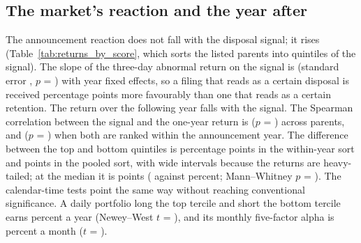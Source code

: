 \begin{table}
\centering
\caption{Disposal prediction from the filing text: identified and anonymized conditions}\label{tab:gate1}
{\footnotesize\setlength{\tabcolsep}{3pt}}
\end{table}

\subsection{The market's reaction and the year after}\label{sec:market}

The announcement reaction does not fall with the disposal signal; it rises (Table~\ref{tab:returns_by_score}, which sorts the listed parents into quintiles of the signal). The slope of the three-day abnormal return on the signal is \AnnCarSlope{} (standard error \AnnCarSlopeSE{}, $p$ = \AnnCarSlopeP{}) with year fixed effects, so a filing that reads as a certain disposal is received \AnnCarSlopePP{} percentage points more favourably than one that reads as a certain retention. The return over the following year falls with the signal. The Spearman correlation between the signal and the one-year return is \SpearmanScoreBhar{} ($p$ = \SpearmanScoreBharP) across \NScoreOneY{} parents, and \SpearmanWithinYear{} ($p$ = \SpearmanWithinYearP) when both are ranked within the announcement year. The difference between the top and bottom quintiles is \QQWithinYear{} percentage points in the within-year sort and \QQDiff{} points in the pooled sort, with wide intervals because the returns are heavy-tailed; at the median it is \QQMedianDiff{} points (\QFiveMedian{} against \QOneMedian{} percent; Mann--Whitney $p$ = \QQMWP). The calendar-time tests point the same way without reaching conventional significance. A daily portfolio long the top tercile and short the bottom tercile earns \CTHiLo{} percent a year (Newey--West $t$ = \CTHiLoT), and its monthly five-factor alpha is \FFHiLo{} percent a month ($t$ = \FFHiLoT).

